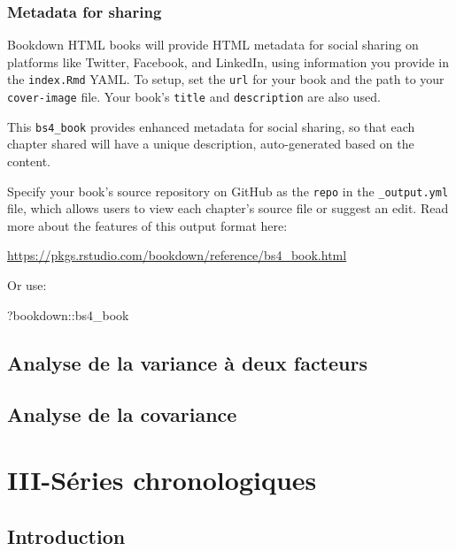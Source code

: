 \documentclass[
]{book}
\newenvironment{Shaded}{\begin{snugshade}}{\end{snugshade}}
\newcommand{\NormalTok}[1]{#1}
\newcommand{\SpecialCharTok}[1]{\textcolor[rgb]{0.00,0.00,0.00}{#1}}
\theoremstyle{definition}
\theoremstyle{definition}
\theoremstyle{definition}
\theoremstyle{definition}
\theoremstyle{remark}
\begin{document}
\hypertarget{metadata-for-sharing}{%
\section{Metadata for sharing}\label{metadata-for-sharing}}

Bookdown HTML books will provide HTML metadata for social sharing on platforms like Twitter, Facebook, and LinkedIn, using information you provide in the \texttt{index.Rmd} YAML. To setup, set the \texttt{url} for your book and the path to your \texttt{cover-image} file. Your book's \texttt{title} and \texttt{description} are also used.

This \texttt{bs4\_book} provides enhanced metadata for social sharing, so that each chapter shared will have a unique description, auto-generated based on the content.

Specify your book's source repository on GitHub as the \texttt{repo} in the \texttt{\_output.yml} file, which allows users to view each chapter's source file or suggest an edit. Read more about the features of this output format here:

\url{https://pkgs.rstudio.com/bookdown/reference/bs4_book.html}

Or use:

\begin{Shaded}
\begin{Highlighting}[]
\NormalTok{?bookdown}\SpecialCharTok{::}\NormalTok{bs4\_book}
\end{Highlighting}
\end{Shaded}

\hypertarget{anova2}{%
\chapter{Analyse de la variance à deux facteurs}\label{anova2}}

\hypertarget{ancova}{%
\chapter{Analyse de la covariance}\label{ancova}}

\hypertarget{part-iii-suxe9ries-chronologiques}{%
\part{III-Séries chronologiques}\label{part-iii-suxe9ries-chronologiques}}

\hypertarget{intro-ts}{%
\chapter{Introduction}\label{intro-ts}}
\end{document}
